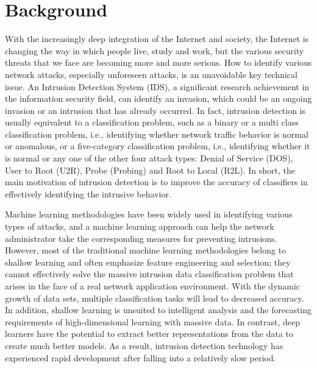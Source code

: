 \section{Background}\label{sec:bkgrnd}%
\vspace{-18pt}
With the increasingly deep integration of the Internet and society, the Internet is changing the way in which people live, study and work, but the various security threats that we face are becoming more and more serious. How to identify various network attacks, especially unforeseen attacks, is an unavoidable key technical issue. An Intrusion Detection System (IDS), a significant research achievement in the information security field, can identify an invasion, which could be an ongoing invasion or an intrusion that has already occurred. In fact, intrusion detection is usually equivalent to a classification problem, such as a binary or a multi class classification problem, i.e., identifying whether network traffic behavior is normal or anomalous, or a five-category classification problem, i.e., identifying whether it is normal or any one of the other four attack types: Denial of Service (DOS), User to Root (U2R), Probe (Probing) and Root to Local (R2L). In short, the main motivation of intrusion detection is to improve the accuracy of classifiers in effectively identifying the intrusive behavior.\par
Machine learning methodologies have been widely used in identifying various types of attacks, and a machine learning approach can help the network administrator take the corresponding measures for preventing intrusions. However, most of the traditional machine learning methodologies belong to shallow learning and often emphasize feature engineering and selection; they cannot effectively solve the massive intrusion data classification problem that arises in the face of a real network application environment. With the dynamic growth of data sets, multiple classification tasks will lead to decreased accuracy. In addition, shallow learning is unsuited to intelligent analysis and the forecasting requirements of high-dimensional learning with massive data. In contrast, deep learners have the potential to extract better representations from the data to create much better models. As a result, intrusion detection technology has experienced rapid development after falling into a relatively slow period\cite{yin2017deep}.%
\par
